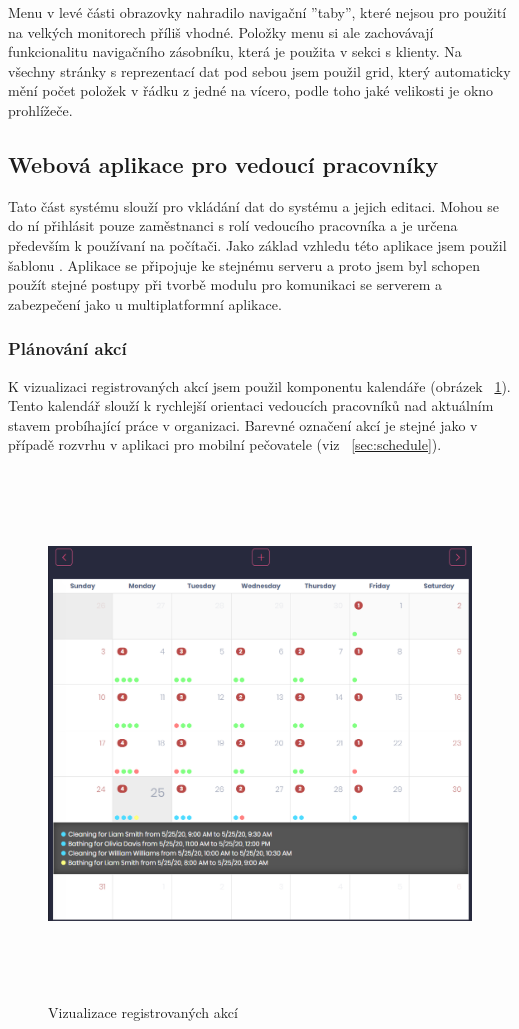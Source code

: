 \documentclass[
  biblatex,
  glossaries,
  index
]{kidiplom}
\begin{document}
Menu v levé části obrazovky nahradilo navigační ''taby'', které nejsou pro použití na velkých monitorech příliš vhodné. Položky menu si ale zachovávají funkcionalitu navigačního zásobníku, která je použita v sekci s klienty. Na všechny stránky s reprezentací dat pod sebou jsem použil grid, který automaticky mění počet položek v řádku z jedné na vícero, podle toho jaké velikosti je okno prohlížeče.

\subsection{Webová aplikace pro vedoucí pracovníky}
Tato část systému slouží pro vkládání dat do systému a jejich editaci. Mohou se do ní přihlásit pouze zaměstnanci s rolí vedoucího pracovníka a je určena především k používaní na počítači. Jako základ vzhledu této aplikace jsem použil šablonu \cite{14}. Aplikace se připojuje ke stejnému serveru a proto jsem byl schopen použít stejné postupy při tvorbě modulu pro komunikaci se serverem a zabezpečení jako u multiplatformní aplikace.

\subsubsection{Plánování akcí}
K vizualizaci registrovaných akcí jsem použil komponentu kalendáře (obrázek ~\ref{fig:scheduleVisual}). Tento kalendář slouží k rychlejší orientaci vedoucích pracovníků nad aktuálním stavem probíhající práce v organizaci. Barevné označení akcí je stejné jako v případě rozvrhu v aplikaci pro mobilní pečovatele (viz ~\ref{sec:schedule}).

\begin{figure}[H]
  	\centering
 	 \includegraphics[width=14cm,height=14cm,keepaspectratio]{schedule_mngr}
 	 \caption{Vizualizace registrovaných akcí}
 	 \label{fig:scheduleVisual}
\end{figure}
\end{document}
